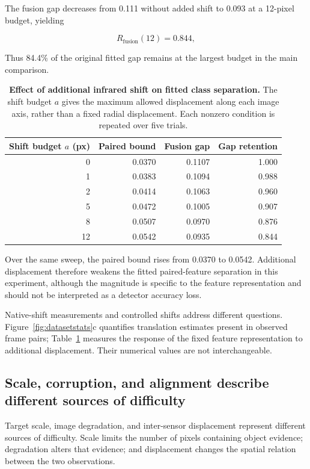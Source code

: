 \documentclass[10pt]{article}
\begin{document}
The fusion gap decreases from 0.111 without added shift to 0.093 at a 12-pixel budget, yielding

\begin{equation}
R_{\mathrm{fusion}}(12)=0.844,
\end{equation}

Thus 84.4\% of the original fitted gap remains at the largest budget in the main comparison.

\begin{table}[t]
\centering
\caption{\textbf{Effect of additional infrared shift on fitted class separation.}
The shift budget $a$ gives the maximum allowed displacement along each image axis, rather than a fixed radial displacement. Each nonzero condition is repeated over five trials.}
\label{tab:alignstressmain}
\small
\begin{tabular}{rrrr}
\toprule
Shift budget $a$ (px) & Paired bound & Fusion gap & Gap retention \\
\midrule
0  & 0.0370 & 0.1107 & 1.000 \\
1  & 0.0383 & 0.1094 & 0.988 \\
2  & 0.0414 & 0.1063 & 0.960 \\
5  & 0.0472 & 0.1005 & 0.907 \\
8  & 0.0507 & 0.0970 & 0.876 \\
12 & 0.0542 & 0.0935 & 0.844 \\
\bottomrule
\end{tabular}
\end{table}

Over the same sweep, the paired bound rises from 0.0370 to 0.0542. Additional displacement therefore weakens the fitted paired-feature separation in this experiment, although the magnitude is specific to the feature representation and should not be interpreted as a detector accuracy loss.

Native-shift measurements and controlled shifts address different questions. Figure~\ref{fig:datasetstats}c quantifies translation estimates present in observed frame pairs; Table~\ref{tab:alignstressmain} measures the response of the fixed feature representation to additional displacement. Their numerical values are not interchangeable.

\subsection{Scale, corruption, and alignment describe different sources of difficulty}

Target scale, image degradation, and inter-sensor displacement represent different sources of difficulty. Scale limits the number of pixels containing object evidence; degradation alters that evidence; and displacement changes the spatial relation between the two observations.
\end{document}
